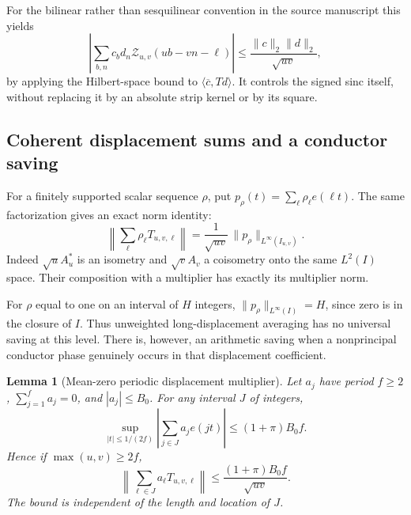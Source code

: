 \documentclass[11pt]{article}
\newtheorem{lemma}[theorem]{Lemma}
\theoremstyle{definition}
\theoremstyle{remark}
\begin{document}
For the bilinear rather than sesquilinear convention in the source
manuscript this yields
\begin{equation}
 \left|\sum_{b,n}c_bd_n\mathscr Z_{u,v}(ub-vn-\ell)\right|
 \le\frac{\|c\|_2\|d\|_2}{\sqrt{uv}},
 \label{eq:f2v95-bilinear}
\end{equation}
by applying the Hilbert-space bound to \(\langle\overline c,Td\rangle\).
It controls the signed sinc itself, without replacing it by an absolute
strip kernel or by its square.

\subsection{Coherent displacement sums and a conductor saving}

For a finitely supported scalar sequence \(\rho\), put
\(p_\rho(t)=\sum_\ell\rho_\ell e(\ell t)\).  The same factorization
gives an exact norm identity:
\begin{equation}
 \left\|\sum_\ell\rho_\ell T_{u,v,\ell}\right\|
 =\frac1{\sqrt{uv}}\,
        \|p_\rho\|_{L^\infty(I_{u,v})}.
 \label{eq:f2v95-multiplier-norm}
\end{equation}
Indeed \(\sqrt u A_u^*\) is an isometry and
\(\sqrt v A_v\) a coisometry onto the same \(L^2(I)\) space.
Their composition with a multiplier has exactly its multiplier norm.

For \(\rho\) equal to one on an interval of \(H\) integers,
\(\|p_\rho\|_{L^\infty(I)}=H\), since zero is in the closure
of \(I\).  Thus unweighted long-displacement averaging has no
universal saving at this level.  There is, however, an arithmetic
saving when a nonprincipal conductor phase genuinely occurs in that
displacement coefficient.

\begin{lemma}[Mean-zero periodic displacement multiplier]
\label{lem:f2v95-periodic}
Let \(a_j\) have period \(f\ge2\), \(\sum_{j=1}^f a_j=0\),
and \(|a_j|\le B_0\).  For any interval \(J\) of integers,
\begin{equation}
 \sup_{|t|\le1/(2f)}
     \left|\sum_{j\in J}a_j e(jt)\right|
 \le(1+\pi)B_0f.
 \label{eq:f2v95-periodic-bound}
\end{equation}
Hence if \(\max(u,v)\ge2f\),
\begin{equation}
 \left\|\sum_{\ell\in J}a_\ell T_{u,v,\ell}\right\|
 \le\frac{(1+\pi)B_0f}{\sqrt{uv}}.
 \label{eq:f2v95-periodic-operator}
\end{equation}
The bound is independent of the length and location of \(J\).
\end{lemma}
\end{document}
